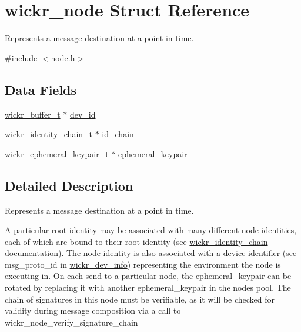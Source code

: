 \hypertarget{structwickr__node}{}\section{wickr\+\_\+node Struct Reference}
\label{structwickr__node}


Represents a message destination at a point in time.  




{\ttfamily \#include $<$node.\+h$>$}

\subsection*{Data Fields}
\begin{DoxyCompactItemize}
\item 
\mbox{\hyperlink{structwickr__buffer}{wickr\+\_\+buffer\+\_\+t}} $\ast$ \mbox{\hyperlink{structwickr__node_a564e42fc1d4b63353d74e5fbf0bead82}{dev\+\_\+id}}
\item 
\mbox{\hyperlink{structwickr__identity__chain}{wickr\+\_\+identity\+\_\+chain\+\_\+t}} $\ast$ \mbox{\hyperlink{structwickr__node_a3a5100ed26ae534e2070623713aacfde}{id\+\_\+chain}}
\item 
\mbox{\hyperlink{structwickr__ephemeral__keypair}{wickr\+\_\+ephemeral\+\_\+keypair\+\_\+t}} $\ast$ \mbox{\hyperlink{structwickr__node_a628b61eed5cb17b831ff687143393b93}{ephemeral\+\_\+keypair}}
\end{DoxyCompactItemize}


\subsection{Detailed Description}
Represents a message destination at a point in time. 

A particular root identity may be associated with many different node identities, each of which are bound to their root identity (see \textquotesingle{}\mbox{\hyperlink{structwickr__identity__chain}{wickr\+\_\+identity\+\_\+chain}}\textquotesingle{} documentation). The node identity is also associated with a device identifier (see \textquotesingle{}msg\+\_\+proto\+\_\+id\textquotesingle{} in \textquotesingle{}\mbox{\hyperlink{structwickr__dev__info}{wickr\+\_\+dev\+\_\+info}}\textquotesingle{}) representing the environment the node is executing in. On each send to a particular node, the ephemeral\+\_\+keypair can be rotated by replacing it with another ephemeral\+\_\+keypair in the node\textquotesingle{}s pool. The chain of signatures in this node must be verifiable, as it will be checked for validity during message composition via a call to \textquotesingle{}wickr\+\_\+node\+\_\+verify\+\_\+signature\+\_\+chain\textquotesingle{} 

